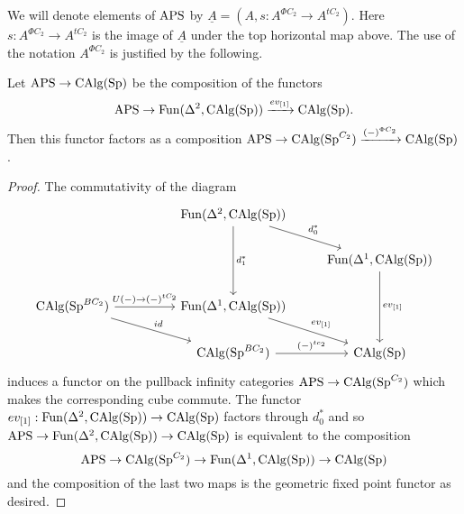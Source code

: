 We will denote elements of $\mathrm{APS}$ by $\underline{A}=(A,s:A^{\Phi C_2}\to A^{tC_2})$. Here $s:A^{\Phi C_2}\to A^{tC_2}$ is the image of $\underline{A}$ under the top horizontal map above. The use of the notation $A^{\Phi C_2}$ is justified by the following.

\begin{lemma}
Let $\mathrm{APS}\to \operatorname{CAlg}(\operatorname{Sp})$ be the composition of the functors \[\mathrm{APS}\to \operatorname{Fun}(\Delta^2,\operatorname{CAlg}(\operatorname{Sp}))\xrightarrow{ev_{[1]}}\operatorname{CAlg}(\operatorname{Sp}).\] Then this functor factors as a composition $\mathrm{APS}\to \operatorname{CAlg}(\operatorname{Sp}^{C_2})\xrightarrow{(-)^{\Phi C_2}}\operatorname{CAlg}(\operatorname{Sp})$. 
\end{lemma}
\begin{proof}
The commutativity of the diagram
\[
\begin{tikzcd}
 & & \operatorname{Fun}(\Delta^2, \CAlg(\Spectra)) \arrow[rd, "d_0^*"] \arrow[dd, "d_1^*"] & \\
 & & & \operatorname{Fun}(\Delta^1,\CAlg(\Spectra)) \arrow[dd,"ev_{[1]}"]\\
\CAlg(\Spectra^{BC_2}) \arrow[rr, "U(-)\to (-)^{tC_2}"] \arrow[rrd, "id"] & & \operatorname{Fun}(\Delta^1, \CAlg(\Spectra)) \arrow[rd, "ev_{[1]}"] & \\
  & & \CAlg(\Spectra^{BC_2}) \arrow[r, "(-)^{tc_2}"] & \CAlg(\Spectra)
\end{tikzcd}
\] induces a functor on the pullback infinity categories $\mathrm{APS}\to \operatorname{CAlg}(\operatorname{Sp}^{C_2})$ which makes the corresponding cube commute. The functor $ev_{[1]}:\operatorname{Fun}(\Delta^2, \operatorname{CAlg}(\operatorname{Sp}))\to \operatorname{CAlg}(\operatorname{Sp})$ factors through $d_0^*$ and so $\mathrm{APS}\to \operatorname{Fun}(\Delta^2, \operatorname{CAlg}(\operatorname{Sp}))\to \operatorname{CAlg}(\operatorname{Sp})$ is equivalent to the composition \[\mathrm{APS}\to \operatorname{CAlg}(\operatorname{Sp}^{C_2})\to \operatorname{Fun}(\Delta^1,\operatorname{CAlg}(\operatorname{Sp}))\to \operatorname{CAlg}(\operatorname{Sp})\] and the composition of the last two maps is the geometric fixed point functor as desired.
\end{proof}

